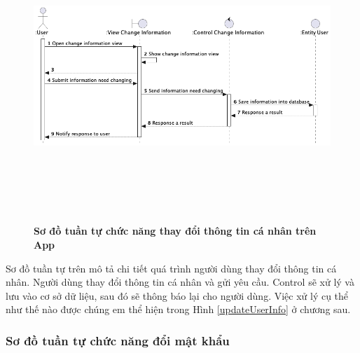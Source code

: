   \begin{figure}[H]
        \centering
        \includegraphics[width=16cm,height=11cm]{Images/mobile_app/change_user_information.png}
        \caption[Sơ đồ tuần tự chức năng thay đổi thông tin cá nhân trên App]{\bfseries \fontsize{12pt}{0pt}
        \selectfont Sơ đồ tuần tự chức năng thay đổi thông tin cá nhân trên App}
        \label{change_user_information} %
  \end{figure}

  Sơ đồ tuần tự trên mô tả chi tiết quá trình người dùng thay đổi thông tin cá nhân. Người dùng thay đổi thông tin cá nhân
  và gửi yêu cầu. Control sẽ xử lý và lưu vào cơ sở dữ liệu, sau đó sẽ thông báo lại cho người dùng.
  Việc xử lý cụ thể như thế nào được chúng em thể hiện trong Hình \ref{updateUserInfo} ở chương sau.

  \subsubsection{Sơ đồ tuần tự chức năng đổi mật khẩu}

